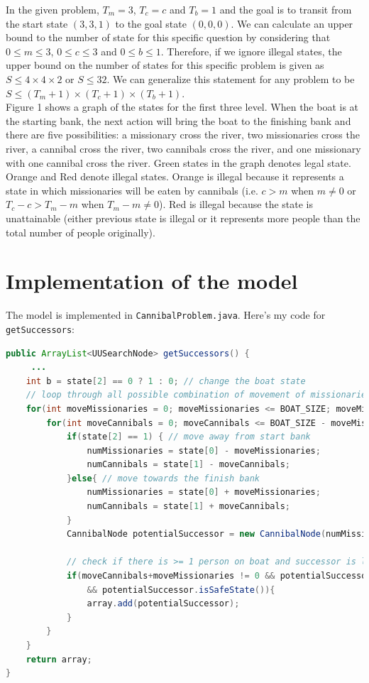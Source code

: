\documentclass[9.5pt]{extarticle}
\begin{document}
In the given problem, $T_m=3$, $T_c=c$ and $T_b=1$ and the goal is to transit from the start state $(3,3,1)$ to the goal state $(0,0,0)$. We can calculate an upper bound to the number of state for this specific question by considering that $0\le m \le 3$, $0 \le c \le 3$ and $0 \le b \le 1$. Therefore, if we ignore illegal states, the upper bound on the number of states for this specific problem is given as $S \le 4 \times 4 \times 2$ or $S \le 32$. We can generalize this statement for any problem to be $ S  \le (T_m+1) \times (T_c+1) \times (T_b + 1)$.\\

Figure 1 shows a graph of the states for the first three level. When the boat is at the starting bank, the next action will bring the boat to the finishing bank and there are five possibilities: a missionary cross the river, two missionaries cross the river, a cannibal cross the river, two cannibals cross the river, and one missionary with one cannibal cross the river. Green states in the graph denotes legal state. Orange and  Red denote illegal states. Orange is illegal because it represents a state in which missionaries will be eaten by cannibals (i.e. $c>m$ when $m \neq 0$ or $T_c - c > T_m - m$ when $T_m - m \neq 0$). Red is illegal because the state is unattainable (either previous state is illegal or it represents more people than the total number of people originally).


\section{Implementation of the model}

The model is implemented in \verb`CannibalProblem.java`.  Here's my code for \verb`getSuccessors`:

\begin{lstlisting}[language=java,caption={Java code for getSuccessors}]
public ArrayList<UUSearchNode> getSuccessors() {
	 ...
	int b = state[2] == 0 ? 1 : 0; // change the boat state
	// loop through all possible combination of movement of missionaries and cannibals
	for(int moveMissionaries = 0; moveMissionaries <= BOAT_SIZE; moveMissionaries++){
		for(int moveCannibals = 0; moveCannibals <= BOAT_SIZE - moveMissionaries; moveCannibals++) {
			if(state[2] == 1) { // move away from start bank
				numMissionaries = state[0] - moveMissionaries;
				numCannibals = state[1] - moveCannibals;
			}else{ // move towards the finish bank
				numMissionaries = state[0] + moveMissionaries;
				numCannibals = state[1] + moveCannibals;
			}
			CannibalNode potentialSuccessor = new CannibalNode(numMissionaries,numCannibals,b,depth);

			// check if there is >= 1 person on boat and successor is legal and safe 
			if(moveCannibals+moveMissionaries != 0 && potentialSuccessor.isLegalState()
				&& potentialSuccessor.isSafeState()){
				array.add(potentialSuccessor);
			}
		}
	}
	return array;
}
\end{lstlisting}
\end{document}
